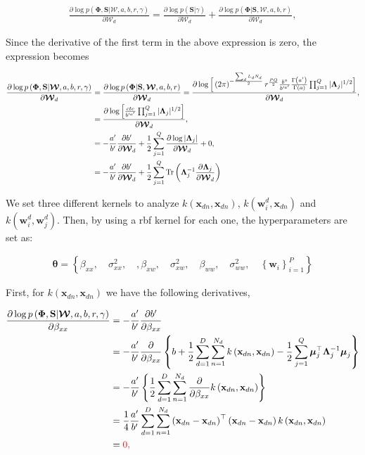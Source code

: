 \documentclass[]{article}
\newcommand{\dWj}{\partial\projMat}
\newcommand{\kernel}[2]{k\left(#1,#2\right)}
\newcommand{\kernelww}[2]{k\left(\mathbf{w}_{#1}^d,\mathbf{w}_{#2}^d\right)}
\newcommand{\kernelwx}[1]{k\left(\mathbf{w}_{#1}^d,\indobj\right)}
\newcommand{\C}{\boldsymbol{\Lambda}_j}
\newcommand{\muJ}{\boldsymbol{\mu}_j}
\newcommand{\W}{\boldsymbol{\mathcal{W}}}
\newcommand{\indobj}{\mathbf{x}_{dn}}
\newcommand{\projMat}{\boldsymbol{\mathcal{W}}_d}
\newcommand{\likel}{\log p\left(\boldsymbol{\Phi},\mathbf{S}|\W,a,b,r,\gamma\right)}
\begin{document}
\begin{align}
\frac{\partial \log p\left(\boldsymbol{\Phi},\mathbf{S}|\W,a,b,r,\gamma\right)}{\partial\projMat} =
\frac{\partial \log p\left(\mathbf{S}|\gamma\right)}{\partial\projMat} + \frac{\partial \log p\left(\boldsymbol{\Phi}|\mathbf{S},\boldsymbol{\mathcal{W}},a,b,r\right)}{\partial\projMat},
\end{align}

Since the derivative of the first term in the above expression is zero, the expression becomes

\begin{align}
\frac{\partial \log p\left(\boldsymbol{\Phi},\mathbf{S}|\W,a,b,r,\gamma\right)}{\partial\projMat} &=
\frac{\partial \log p\left(\boldsymbol{\Phi}|\mathbf{S},\boldsymbol{\mathcal{W}},a,b,r\right)}{\partial\projMat} = \frac{\partial \log \Big[\left(2\pi\right)^{-\frac{\sum_d L_d N_d}{2}}r^{\frac{PQ}{2}}\frac{b^{a}}{b'^{a'}}\frac{\Gamma\left(a'\right)}{\Gamma\left(a\right)}\prod_{j=1}^{Q}|\C|^{1/2}\Big]}{\partial\projMat},\notag\\
&= \frac{\partial \log \Big[\frac{cte}{b'^{a'}} \prod_{j=1}^{Q}|\C|^{1/2}\Big]}{\partial\projMat}\notag,\\
& = -\frac{a'}{b'}\frac{\partial b'}{\dWj}+\frac{1}{2}\sum_{j=1}^{Q}\frac{\partial \log |\C|}{\dWj}+0 , \notag \\
& =  -\frac{a'}{b'}\frac{\partial b'}{\dWj}+\frac{1}{2}\sum_{j=1}^{Q} \operatorname{Tr}\left(\C^{-1}\frac{\partial \C}{\dWj}\right)
\label{eq:derivativeW2}
\end{align}


We set three different kernels to analyze $\kernel{\indobj}{\indobj}$, $\kernelwx{i}$ and $\kernelww{i}{j}$. Then, by using a rbf kernel for each one, the hyperparameters are set as:

\begin{align}
\boldsymbol{\theta} = \left\{\beta_{xx},\quad \sigma^2_{xx}, \quad,\beta_{xw},\quad \sigma^2_{xw}, \quad \beta_{ww},\quad \sigma^2_{ww}, \quad \left\{\mathbf{w}_i\right\}_{i=1}^{P}\right\}
\end{align}

First, for $\kernel{\indobj}{\indobj}$  we have the following derivatives,


\begin{align}
\frac{\partial \likel}{\partial \beta_{xx}} &= -\frac{a'}{b'}\frac{\partial b'}{\partial \beta_{xx}} \\
& =  -\frac{a'}{b'}\frac{\partial }{\partial \beta_{xx}}\left\{b+{\frac{1}{2}}\sum\limits_{d=1}^{D}\sum\limits_{n=1}^{N_d}\kernel{\indobj}{\indobj}-{\frac{1}{2}}\sum\limits_{j=1}^{Q}\boldsymbol{\mu}_j^\top \C^{-1}\muJ\right\} \\
& = -\frac{a'}{b'}\left\{\frac{1}{2}\sum\limits_{d=1}^{D}\sum\limits_{n=1}^{N_d}\frac{\partial }{\partial \beta_{xx}}\kernel{\indobj}{\indobj}\right\} \\
& = \frac{1}{4}\frac{a'}{b'}\sum\limits_{d=1}^{D}{\sum\limits_{n=1}^{N_d} {\left(\indobj - \indobj\right)^\top\left(\indobj - \indobj\right)\kernel{\indobj}{\indobj}}}\\
& = \color{red}{0},
\end{align}
\end{document}

